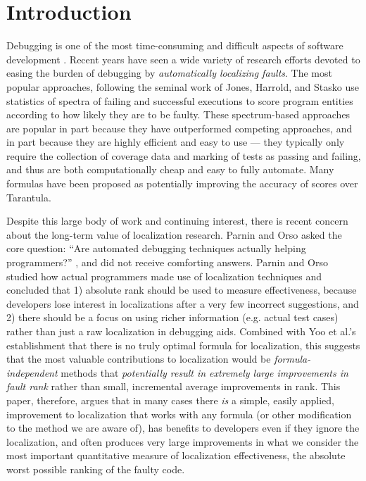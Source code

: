 \section{Introduction}

Debugging is one of the most time-consuming and difficult aspects of
software development \cite{Vesey,BallVis}.  Recent years have seen a
wide variety of research efforts devoted to easing the burden of
debugging by \emph{automatically localizing faults}.  The most popular
approaches, following the seminal work of Jones, Harrold, and Stasko
\cite{Jones2002,Tarantula} use statistics of spectra \cite{RepsSpectra} of
failing and successful executions to score program entities according
to how likely they are to be faulty.  These spectrum-based approaches
are popular in part because they have outperformed competing
approaches, and in part because they are highly efficient and easy to
use --- they typically only require the collection of coverage data
and marking of tests as passing and failing, and thus are both
computationally cheap and easy to fully automate.  Many formulas have
been proposed as potentially improving the accuracy of scores
\cite{Ochai,AMPLE,Pinpoint,StatDebug,Abreu:2006:PRDC} over Tarantula.

Despite this large body of work and continuing interest, there is recent concern about the long-term value
of localization research.  Parnin and Orso asked the core
question: ``Are automated debugging techniques actually helping
programmers?''  \cite{AutoHelp}, and did not receive comforting
answers.  Parnin and Orso studied how actual programmers made use of localization techniques \cite{AutoHelp}
and concluded that 1) absolute rank should be used to
measure effectiveness, because developers lose interest in
localizations after a very few incorrect suggestions, and 2) there should be a focus on
using richer information (e.g. actual test cases) rather than just
a raw localization in debugging aids.  Combined with Yoo et al.'s
establishment \cite{yoo2014no} that there is no truly optimal formula
for localization, this suggests that the most valuable contributions
to localization would be \emph{formula-independent} methods that
\emph{potentially result in extremely large improvements in fault
rank} rather than small, incremental average improvements in rank.
This paper, therefore, argues that in many cases there \emph{is} a
simple, easily applied, improvement to localization that works with
any formula (or other modification to the method we are aware of), has
benefits to developers even if they ignore the localization, and often
produces very large improvements in what we consider the most
important quantitative measure of localization effectiveness, the absolute worst
possible ranking of the faulty code.

